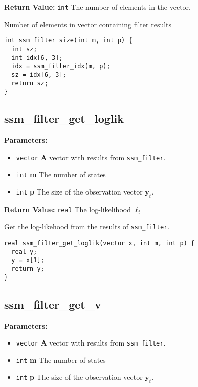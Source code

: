\documentclass[]{book}
\providecommand{\tightlist}{%
  \setlength{\itemsep}{0pt}\setlength{\parskip}{0pt}}
\renewcommand{\vec}[1]{\boldsymbol{#1}}
\begin{document}
\textbf{Return Value:} \texttt{int} The number of elements in the
vector.

Number of elements in vector containing filter results

\begin{verbatim}
int ssm_filter_size(int m, int p) {
  int sz;
  int idx[6, 3];
  idx = ssm_filter_idx(m, p);
  sz = idx[6, 3];
  return sz;
}
\end{verbatim}

\subsection{ssm\_filter\_get\_loglik}\label{ssmux5ffilterux5fgetux5floglik}

\textbf{Parameters:}

\begin{itemize}
\tightlist
\item
  \texttt{vector} \textbf{A} vector with results from
  \texttt{ssm\_filter}.
\item
  \texttt{int} \textbf{m} The number of states
\item
  \texttt{int} \textbf{p} The size of the observation vector
  \(\vec{y}_t\).
\end{itemize}

\textbf{Return Value:} \texttt{real} The log-likelihood \(\ell_t\)

Get the log-likehood from the results of \texttt{ssm\_filter}.

\begin{verbatim}
real ssm_filter_get_loglik(vector x, int m, int p) {
  real y;
  y = x[1];
  return y;
}
\end{verbatim}

\subsection{ssm\_filter\_get\_v}\label{ssmux5ffilterux5fgetux5fv}

\textbf{Parameters:}

\begin{itemize}
\tightlist
\item
  \texttt{vector} \textbf{A} vector with results from
  \texttt{ssm\_filter}.
\item
  \texttt{int} \textbf{m} The number of states
\item
  \texttt{int} \textbf{p} The size of the observation vector
  \(\vec{y}_t\).
\end{itemize}
\end{document}
